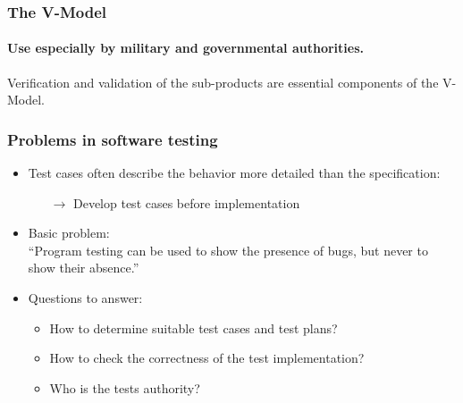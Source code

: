 
\begin{frame}
\frametitle{The V-Model}
\framesubtitle{Use especially by military and governmental authorities.}
\begin{center}
\end{center}
Verification and validation of the sub-products are essential components of the V-Model.
\end{frame}


\begin{frame}
\frametitle{Problems in software testing}
\begin{itemize}
  \item Test cases often describe the behavior more detailed than the specification: 
    \begin{itemize}
      \item[$\rightarrow$] Develop test cases before implementation
    \end{itemize}
  \item Basic problem: \\
        ``Program testing can be used to show the presence of bugs, but never to show their absence.'' %
  \item Questions to answer:
   \begin{itemize}
  	\item How to determine suitable test cases and test plans? 
    \item How to check the correctness of the test implementation? 
    \item Who is the tests authority? 
   \end{itemize}
\end{itemize}
\end{frame}



